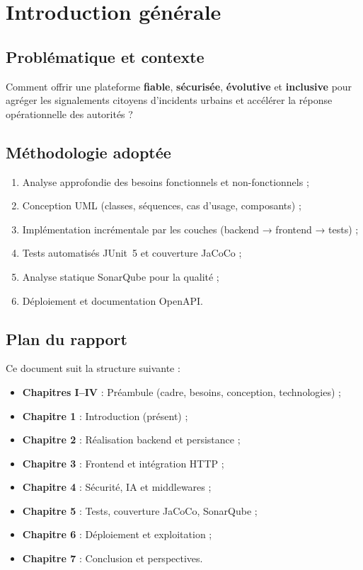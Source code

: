 \documentclass[12pt,a4paper,twoside,openright]{book}
\begin{document}
\setcounter{chapter}{0}

\chapter{Introduction générale}
\label{chap:intro}

\section{Problématique et contexte}
Comment offrir une plateforme \textbf{fiable}, \textbf{sécurisée}, \textbf{évolutive} et \textbf{inclusive} pour agréger les signalements citoyens d'incidents urbains et accélérer la réponse opérationnelle des autorités ?

\section{Méthodologie adoptée}
\begin{enumerate}
  \item Analyse approfondie des besoins fonctionnels et non-fonctionnels ;
  \item Conception UML (classes, séquences, cas d'usage, composants) ;
  \item Implémentation incrémentale par les couches (backend → frontend → tests) ;
  \item Tests automatisés JUnit~5 et couverture JaCoCo ;
  \item Analyse statique SonarQube pour la qualité ;
  \item Déploiement et documentation OpenAPI.
\end{enumerate}

\section{Plan du rapport}
Ce document suit la structure suivante :
\begin{itemize}
  \item \textbf{Chapitres I–IV} : Préambule (cadre, besoins, conception, technologies) ;
  \item \textbf{Chapitre 1} : Introduction (présent) ;
  \item \textbf{Chapitre 2} : Réalisation backend et persistance ;
  \item \textbf{Chapitre 3} : Frontend et intégration HTTP ;
  \item \textbf{Chapitre 4} : Sécurité, IA et middlewares ;
  \item \textbf{Chapitre 5} : Tests, couverture JaCoCo, SonarQube ;
  \item \textbf{Chapitre 6} : Déploiement et exploitation ;
  \item \textbf{Chapitre 7} : Conclusion et perspectives.
\end{itemize}
\end{document}
